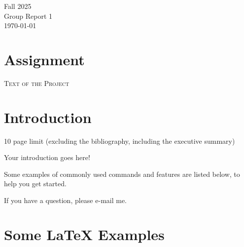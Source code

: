 \documentclass[12pt]{article}
\begin{document}
\begin{titlepage}
{\Large Fall 2025 \\Group Report 1 \\ \today}\\[1cm]


 

\vfill

\end{titlepage}

\newpage
\sffamily
{}

\section*{Assignment}

\noindent
\textsc{Text of the Project}

\newpage
\pagecolor{white}
\rmfamily
\setcounter{page}{1}

\begin{abstract}
EXECUTIVE SUMMARY (MAX 1 PAGE)

\vspace{1cm}
\noindent
CONTRIBUTION STATEMENT: 

\noindent
All the authors equally participated in the project.
\textsf{or specify the different contributions, reporting possible disagreements.}
\end{abstract}

\section{Introduction}

10 page limit (excluding the bibliography, including the executive summary)

Your introduction goes here! 

Some examples of commonly used commands and features are listed below, to help you get started.

If you have a question, please e-mail me.

\section{Some \LaTeX{} Examples}
\label{sec:examples}
\end{document}
